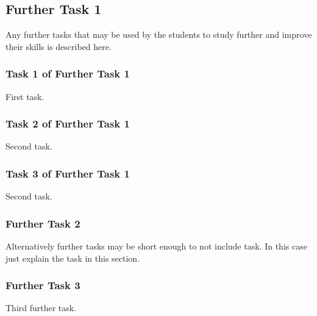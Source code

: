 \documentclass[a4paper]{article}
\begin{document}
\subsection{Further Task 1}
Any further tasks that may be used by the students to study further and improve their skills is described here.

\subsubsection{Task 1 of Further Task 1}
First task.

\subsubsection{Task 2 of Further Task 1}
Second task.

\subsubsection{Task 3 of Further Task 1}
Second task.

\subsubsection{Further Task 2}
Alternatively further tasks may be short enough to not include task. In this case just explain the task in this section.

\subsubsection{Further Task 3}
Third further task.
\end{document}
